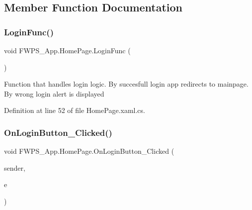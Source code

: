 \subsection{Member Function Documentation}
\mbox{\label{class_f_w_p_s___app_1_1_home_page_a7a387157af98a0948b4df8bbd95173f0}} 
\subsubsection{\texorpdfstring{Login\+Func()}{LoginFunc()}}
{\footnotesize\ttfamily void F\+W\+P\+S\+\_\+\+App.\+Home\+Page.\+Login\+Func (\begin{DoxyParamCaption}{ }\end{DoxyParamCaption})\hspace{0.3cm}{\ttfamily [private]}}

Function that handles login logic. By succesfull login app redirects to mainpage. By wrong login alert is displayed 

Definition at line 52 of file Home\+Page.\+xaml.\+cs.

\mbox{\label{class_f_w_p_s___app_1_1_home_page_a3f1ba9f8247e776351e28d08fc575533}} 
\subsubsection{\texorpdfstring{On\+Login\+Button\+\_\+\+Clicked()}{OnLoginButton\_Clicked()}}
{\footnotesize\ttfamily void F\+W\+P\+S\+\_\+\+App.\+Home\+Page.\+On\+Login\+Button\+\_\+\+Clicked (\begin{DoxyParamCaption}\item[{object}]{sender,  }\item[{Event\+Args}]{e }\end{DoxyParamCaption})\hspace{0.3cm}{\ttfamily [private]}}



